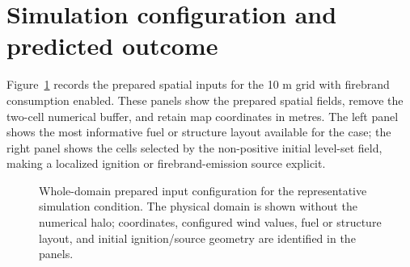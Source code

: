 \section{Simulation configuration and predicted outcome}

Figure~\ref{fig:input-configuration} records the prepared spatial inputs for the 10 m grid with firebrand consumption enabled.
These panels show the prepared spatial fields, remove the
two-cell numerical buffer, and retain map coordinates in metres.  The left panel shows
the most informative fuel or structure layout available for the case; the right panel
shows the cells selected by the non-positive initial level-set field, making a localized
ignition or firebrand-emission source explicit.

\begin{figure}[H]
\centering
{}
\caption{Whole-domain prepared input configuration for the representative simulation condition.  The
physical domain is shown without the numerical halo; coordinates, configured wind values,
fuel or structure layout, and initial ignition/source geometry are identified in the panels.}
\label{fig:input-configuration}
\end{figure}

